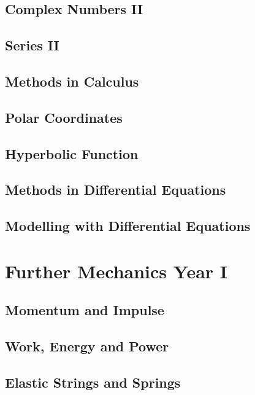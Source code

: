 \documentclass{book}
\begin{document}
    \section{Complex Numbers II} \label{complex_numbers_ii}
    \newpage
    \section{Series II} \label{series_ii}
    \newpage
    \section{Methods in Calculus} \label{methods_in_calculus}
    \newpage
    \section{Polar Coordinates} \label{polar_coordinates}
    \newpage
    \section{Hyperbolic Function} \label{hyperbolic_functions}
    \newpage
    \section{Methods in Differential Equations} \label{methods_in_differential_equations}
    \newpage
    \section{Modelling with Differential Equations} \label{nodelling_with_differential_equations}
    \newpage

\chapter{Further Mechanics Year I} \label{ch:mechanics_i}
    \section{Momentum and Impulse} \label{momentum_and_impulse}
    \newpage
    \section{Work, Energy and Power} \label{work_energy_and_power}
    \newpage
    \section{Elastic Strings and Springs} \label{elastic_strings_and_springs}
    \newpage
\end{document}
